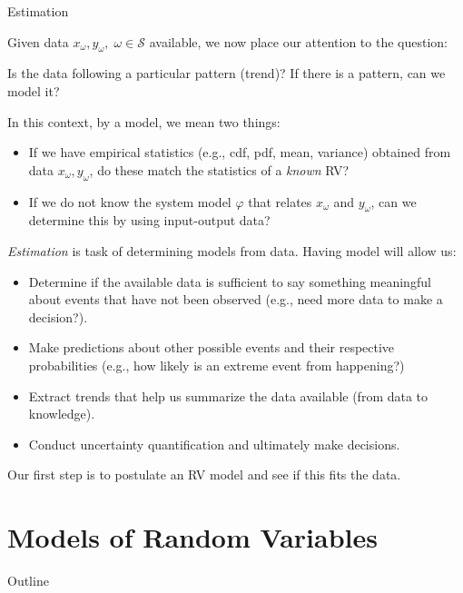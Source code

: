 \documentclass[9pt]{beamer}
\begin{document}
%
\begin{frame}{Estimation}

Given data $x_\omega, y_\omega,\; \omega \in \mathcal{S}$ available, we now place our attention to the question:
\begin{block}{}
Is the data following a particular pattern (trend)? If there is a pattern, can we model it? 
\end{block}
In this context, by a model, we mean two things: 
\begin{itemize}
 \setlength{\itemsep}{5pt}
\item If we have empirical statistics (e.g., cdf, pdf, mean, variance) obtained from data $x_\omega,y_\omega$, do these match the statistics of a {\em known} RV?
\item If we do not know the system model $\varphi$ that relates $x_\omega$ and $y_\omega$, can we determine this by using input-output data? 
\end{itemize}
{\em Estimation} is task of determining models from data.  Having model will allow us:
\begin{block}{}
\begin{itemize}
\item Determine if the available data is sufficient to say something meaningful about events that have not been observed (e.g., need more data to make a decision?). 
\item Make predictions about other possible events and their respective probabilities (e.g., how likely is an extreme event from happening?)
\item Extract trends that help us summarize the data available (from data to knowledge). 
\item Conduct uncertainty quantification and ultimately make decisions. 
\end{itemize}
\end{block}
Our first step is to postulate an RV model and see if this fits the data. 
\end{frame}

\section{Models of Random Variables}
\begin{frame}{Outline}
\tableofcontents[currentsection]
\end{frame}
\end{document}
